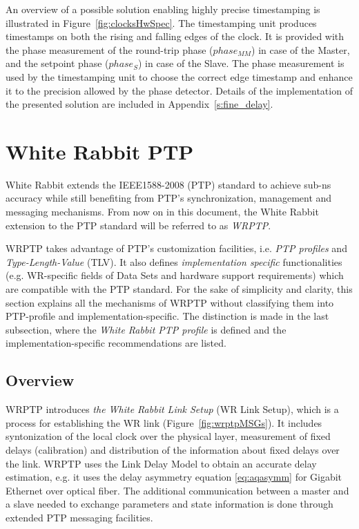\documentclass[a4paper, 12pt]{article}
\begin{document}
An overview of a possible solution enabling highly precise timestamping is illustrated in 
Figure~\ref{fig:clocksHwSpec}. The timestamping unit produces timestamps on both the rising 
and falling edges of the clock. It is provided with the phase measurement of the round-trip phase 
($phase_{MM}$) in case of the Master, and the setpoint phase ($phase_{S}$) in case of the Slave. 
The phase measurement is used by the timestamping unit to choose the correct edge timestamp and 
enhance it to the precision allowed by the phase detector. 
Details of the implementation of the presented solution are included in Appendix~\ref{s:fine_delay}.




\newpage

\section{White Rabbit PTP }


White Rabbit extends the IEEE1588-2008 (PTP) standard to achieve sub-ns accuracy while still 
benefiting from PTP's synchronization, management and messaging mechanisms. From now on in this
document, the White Rabbit extension to the PTP standard will be referred to as \textit{WRPTP}.

WRPTP takes advantage of PTP's customization facilities, i.e. \textit{PTP profiles} and 
\textit{Type-Length-Value} (TLV).
It also defines \textit{implementation specific} functionalities (e.g. WR-specific fields of 
Data Sets and hardware support requirements) which are compatible with the PTP standard. 
For the sake of simplicity and clarity, this section explains all the mechanisms of WRPTP without 
classifying them into PTP-profile
and implementation-specific. The distinction is 
made in the last subsection, where the \textit{White Rabbit PTP profile} is defined and 
the implementation-specific recommendations are listed.

\subsection{Overview}
\label{sec:wrptpOverview}


WRPTP introduces \textit{the White Rabbit Link Setup} (WR Link Setup), which is a process for 
establishing the WR link  (Figure~\ref{fig:wrptpMSGs}). It includes syntonization of the local clock
 over the physical layer, measurement of fixed delays (calibration)  and distribution of the 
information about fixed delays over the link. WRPTP uses the Link Delay 
Model to obtain an accurate delay estimation, e.g. it uses the delay asymmetry equation 
\eqref{eq:aqasymm}  for Gigabit Ethernet over optical fiber. The additional communication between 
a master and a slave needed to exchange parameters and state information is done through extended 
PTP messaging facilities. 
\end{document}
